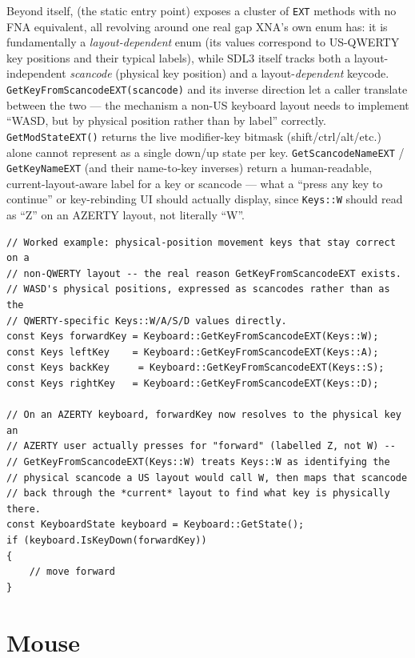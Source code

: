 Beyond  itself,  (the static entry point) exposes a
cluster of \texttt{EXT} methods with no FNA equivalent, all revolving around one real gap
XNA's own  enum has: it is fundamentally a \emph{layout-dependent} enum (its
values correspond to US-QWERTY key positions and their typical labels), while SDL3 itself
tracks both a layout-independent \emph{scancode} (physical key position) and a
layout-\emph{dependent} keycode. \texttt{GetKeyFromScancodeEXT(scancode)} and its inverse
direction let a caller translate between the two --- the mechanism a non-US keyboard layout
needs to implement ``WASD, but by physical position rather than by label'' correctly.
\texttt{GetModStateEXT()} returns the live modifier-key bitmask (shift/ctrl/alt/etc.)
 alone cannot represent as a single down/up state per key.
\texttt{GetScancodeNameEXT} / \texttt{GetKeyNameEXT} (and their name-to-key inverses) return a
human-readable, current-layout-aware label for a key or scancode --- what a ``press any key to
continue'' or key-rebinding UI should actually display, since \texttt{Keys::W} should read as
``Z'' on an AZERTY layout, not literally ``W''.

\begin{lstlisting}
// Worked example: physical-position movement keys that stay correct on a
// non-QWERTY layout -- the real reason GetKeyFromScancodeEXT exists.
// WASD's physical positions, expressed as scancodes rather than as the
// QWERTY-specific Keys::W/A/S/D values directly.
const Keys forwardKey = Keyboard::GetKeyFromScancodeEXT(Keys::W);
const Keys leftKey    = Keyboard::GetKeyFromScancodeEXT(Keys::A);
const Keys backKey     = Keyboard::GetKeyFromScancodeEXT(Keys::S);
const Keys rightKey   = Keyboard::GetKeyFromScancodeEXT(Keys::D);

// On an AZERTY keyboard, forwardKey now resolves to the physical key an
// AZERTY user actually presses for "forward" (labelled Z, not W) --
// GetKeyFromScancodeEXT(Keys::W) treats Keys::W as identifying the
// physical scancode a US layout would call W, then maps that scancode
// back through the *current* layout to find what key is physically there.
const KeyboardState keyboard = Keyboard::GetState();
if (keyboard.IsKeyDown(forwardKey))
{
    // move forward
}
\end{lstlisting}

\section{Mouse}

